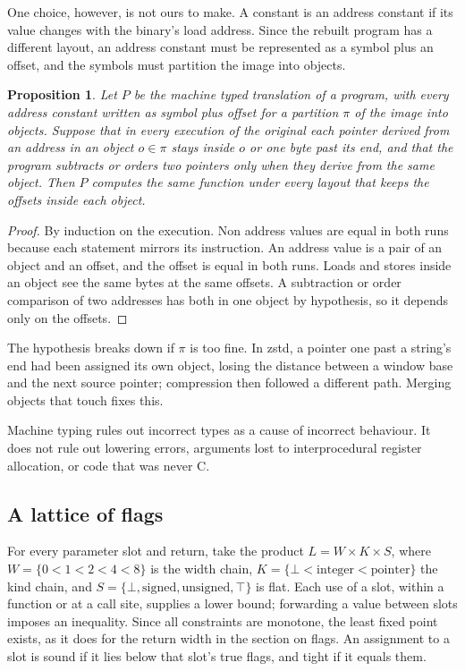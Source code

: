 \documentclass[11pt]{article}
\newtheorem{proposition}[theorem]{Proposition}
\theoremstyle{definition}
\theoremstyle{remark}
\begin{document}
One choice, however, is not ours to make. A constant is an address constant if its value changes with the binary's load address. Since the rebuilt program has a different layout, an address constant must be represented as a symbol plus an offset, and the symbols must partition the image into objects.

\begin{proposition}
Let $P$ be the machine typed translation of a program, with every address constant written as symbol plus offset for a partition $\pi$ of the image into objects. Suppose that in every execution of the original each pointer derived from an address in an object $o \in \pi$ stays inside $o$ or one byte past its end, and that the program subtracts or orders two pointers only when they derive from the same object. Then $P$ computes the same function under every layout that keeps the offsets inside each object.
\end{proposition}

\begin{proof}
By induction on the execution. Non address values are equal in both runs because each statement mirrors its instruction. An address value is a pair of an object and an offset, and the offset is equal in both runs. Loads and stores inside an object see the same bytes at the same offsets. A subtraction or order comparison of two addresses has both in one object by hypothesis, so it depends only on the offsets.
\end{proof}

The hypothesis breaks down if $\pi$ is too fine. In zstd, a pointer one past a string's end had been assigned its own object, losing the distance between a window base and the next source pointer; compression then followed a different path. Merging objects that touch fixes this.

Machine typing rules out incorrect types as a cause of incorrect behaviour. It does not rule out lowering errors, arguments lost to interprocedural register allocation, or code that was never C.

\subsection{A lattice of flags}

For every parameter slot and return, take the product $L = W \times K \times S$, where $W = \{0 < 1 < 2 < 4 < 8\}$ is the width chain, $K = \{\bot < \mathrm{integer} < \mathrm{pointer}\}$ the kind chain, and $S = \{\bot, \mathrm{signed}, \mathrm{unsigned}, \top\}$ is flat. Each use of a slot, within a function or at a call site, supplies a lower bound; forwarding a value between slots imposes an inequality. Since all constraints are monotone, the least fixed point exists, as it does for the return width in the section on flags. An assignment to a slot is sound if it lies below that slot's true flags, and tight if it equals them.
\end{document}
